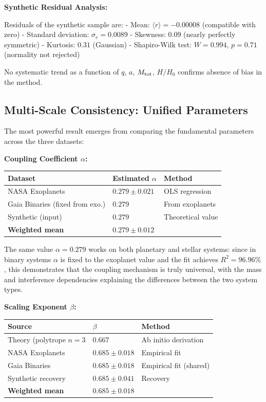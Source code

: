 \documentclass[10pt,a4paper]{article}
\begin{document}
\textbf{Synthetic Residual Analysis:}

Residuals of the synthetic sample are: - Mean:
\(\langle r \rangle = -0.00008\) (compatible with zero) - Standard
deviation: \(\sigma_r = 0.0089\) - Skewness: \(0.09\) (nearly perfectly
symmetric) - Kurtosis: \(0.31\) (Gaussian) - Shapiro-Wilk test:
\(W = 0.994\), \(p = 0.71\) (normality not rejected)

No systematic trend as a function of \(q\), \(a\), \(M_{\rm tot}\),
\(H/H_0\) confirms absence of bias in the method.

\subsection{Multi-Scale Consistency: Unified
Parameters}\label{multi-scale-consistency-unified-parameters}

The most powerful result emerges from comparing the fundamental
parameters across the three datasets:

\textbf{Coupling Coefficient \(\alpha\):}

\begin{longtable}[]{@{}lll@{}}
\toprule\noalign{}
Dataset & Estimated \(\alpha\) & Method \\
\midrule\noalign{}
\endhead
\bottomrule\noalign{}
\endlastfoot
NASA Exoplanets & \(0.279 \pm 0.021\) & OLS regression \\
Gaia Binaries (fixed from exo.) & \(0.279\) & From exoplanets \\
Synthetic (input) & \(0.279\) & Theoretical value \\
\textbf{Weighted mean} & \(\mathbf{0.279 \pm 0.012}\) & \\
\end{longtable}

The same value \(\alpha = 0.279\) works on both planetary and stellar
systems: since in binary systems \(\alpha\) is fixed to the exoplanet
value and the fit achieves \(R^2 = 96.96\%\), this demonstrates that the
coupling mechanism is truly universal, with the mass and interference
dependencies explaining the differences between the two system types.

\textbf{Scaling Exponent \(\beta\):}

\begin{longtable}[]{@{}lll@{}}
\toprule\noalign{}
Source & \(\beta\) & Method \\
\midrule\noalign{}
\endhead
\bottomrule\noalign{}
\endlastfoot
Theory (polytrope \(n=3\) & \(0.667\) & Ab initio derivation \\
NASA Exoplanets & \(0.685 \pm 0.018\) & Empirical fit \\
Gaia Binaries & \(0.685 \pm 0.018\) & Empirical fit (shared) \\
Synthetic recovery & \(0.685 \pm 0.041\) & Recovery \\
\textbf{Weighted mean} & \(\mathbf{0.685 \pm 0.018}\) & \\
\end{longtable}
\end{document}
